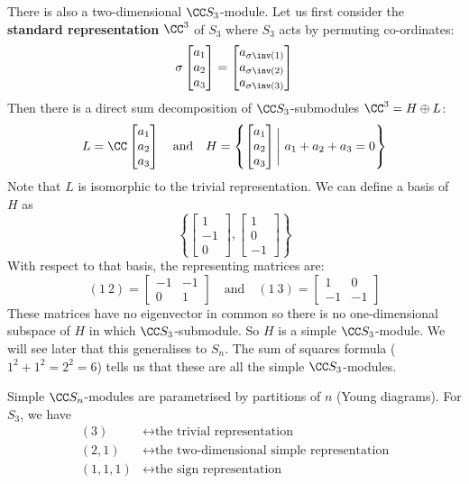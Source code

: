 \begin{exam}
\begin{enum}
		There is also a two-dimensional $\CC S_3$-module.
		Let us first consider the \textbf{standard representation} $\CC^3$ of $S_3$ where $S_3$ acts by permuting co-ordinates:
		\[\sigma
		\begin{bmatrix}
			a_1 \\ a_2 \\ a_3
		\end{bmatrix}
		=
		\begin{bmatrix}
			a_{\sigma\inv(1)} \\ a_{\sigma\inv(2)} \\ a_{\sigma\inv(3)}
		\end{bmatrix}\]
		Then there is a direct sum decomposition of $\CC S_3$-submodules $\CC^3=H\oplus L$:
		\[L=\CC
		\begin{bmatrix}
			a_1 \\ a_2 \\ a_3
		\end{bmatrix}
		\quad\text{and}\quad
		H=\left\{
		\begin{bmatrix}
			a_1 \\ a_2 \\ a_3
		\end{bmatrix}
		\Bigg \vert \
		a_1+a_2+a_3=0
		\right\}\]
		Note that $L$ is isomorphic to the trivial representation.
		We can define a basis of $H$ as
		\[\left\{
		\begin{bmatrix}
			1 \\ -1 \\ 0
		\end{bmatrix},
		\begin{bmatrix}
			1 \\ 0 \\ -1
		\end{bmatrix}
		\right\}\]
		With respect to that basis, the representing matrices are:
		\[(1\ 2)=
		\begin{bmatrix}
			-1 & -1 \\
			0 & 1
		\end{bmatrix}
		\quad\text{and}\quad
		(1\ 3)=
		\begin{bmatrix}
			1 & 0 \\
			-1 & -1
		\end{bmatrix}
		\]
		These matrices have no eigenvector in common so there is no one-dimensional subspace of $H$ in which $\CC S_3$-submodule.
		So $H$ is a simple $\CC S_3$-module.
		We will see later that this generalises to $S_n$.
		The sum of squares formula ($1^2+1^2=2^2=6$) tells us that these are all the simple $\CC S_3$-modules.
	\end{enum}
\end{exam}

\begin{rmk}	
	Simple $\CC S_n$-modules are parametrised by partitions of $n$ (Young diagrams).
	For $S_3$, we have
	\begin{align*}
		(3) &\longleftrightarrow \text{the trivial representation} \\
		(2,1) &\longleftrightarrow \text{the two-dimensional simple representation} \\
		(1,1,1) &\longleftrightarrow \text{the sign representation}
	\end{align*}
\end{rmk}
